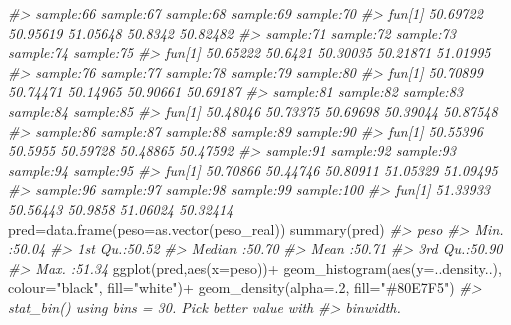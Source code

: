 \documentclass[
]{book}
\newenvironment{Shaded}{\begin{snugshade}}{\end{snugshade}}
\newcommand{\AttributeTok}[1]{\textcolor[rgb]{0.77,0.63,0.00}{#1}}
\newcommand{\CommentTok}[1]{\textcolor[rgb]{0.56,0.35,0.01}{\textit{#1}}}
\newcommand{\DecValTok}[1]{\textcolor[rgb]{0.00,0.00,0.81}{#1}}
\newcommand{\FunctionTok}[1]{\textcolor[rgb]{0.00,0.00,0.00}{#1}}
\newcommand{\NormalTok}[1]{#1}
\newcommand{\OtherTok}[1]{\textcolor[rgb]{0.56,0.35,0.01}{#1}}
\newcommand{\SpecialCharTok}[1]{\textcolor[rgb]{0.00,0.00,0.00}{#1}}
\newcommand{\StringTok}[1]{\textcolor[rgb]{0.31,0.60,0.02}{#1}}
\begin{document}
\begin{Shaded}
\begin{Highlighting}[]
\CommentTok{\#\textgreater{}        sample:66 sample:67 sample:68 sample:69 sample:70}
\CommentTok{\#\textgreater{} fun[1]  50.69722  50.95619  51.05648   50.8342  50.82482}
\CommentTok{\#\textgreater{}        sample:71 sample:72 sample:73 sample:74 sample:75}
\CommentTok{\#\textgreater{} fun[1]  50.65222   50.6421  50.30035  50.21871  51.01995}
\CommentTok{\#\textgreater{}        sample:76 sample:77 sample:78 sample:79 sample:80}
\CommentTok{\#\textgreater{} fun[1]  50.70899  50.74471  50.14965  50.90661  50.69187}
\CommentTok{\#\textgreater{}        sample:81 sample:82 sample:83 sample:84 sample:85}
\CommentTok{\#\textgreater{} fun[1]  50.48046  50.73375  50.69698  50.39044  50.87548}
\CommentTok{\#\textgreater{}        sample:86 sample:87 sample:88 sample:89 sample:90}
\CommentTok{\#\textgreater{} fun[1]  50.55396   50.5955  50.59728  50.48865  50.47592}
\CommentTok{\#\textgreater{}        sample:91 sample:92 sample:93 sample:94 sample:95}
\CommentTok{\#\textgreater{} fun[1]  50.70866  50.44746  50.80911  51.05329  51.09495}
\CommentTok{\#\textgreater{}        sample:96 sample:97 sample:98 sample:99 sample:100}
\CommentTok{\#\textgreater{} fun[1]  51.33933  50.56443   50.9858  51.06024   50.32414}
\NormalTok{pred}\OtherTok{=}\FunctionTok{data.frame}\NormalTok{(}\AttributeTok{peso=}\FunctionTok{as.vector}\NormalTok{(peso\_real))}
\FunctionTok{summary}\NormalTok{(pred)}
\CommentTok{\#\textgreater{}       peso      }
\CommentTok{\#\textgreater{}  Min.   :50.04  }
\CommentTok{\#\textgreater{}  1st Qu.:50.52  }
\CommentTok{\#\textgreater{}  Median :50.70  }
\CommentTok{\#\textgreater{}  Mean   :50.71  }
\CommentTok{\#\textgreater{}  3rd Qu.:50.90  }
\CommentTok{\#\textgreater{}  Max.   :51.34}
\FunctionTok{ggplot}\NormalTok{(pred,}\FunctionTok{aes}\NormalTok{(}\AttributeTok{x=}\NormalTok{peso))}\SpecialCharTok{+}
  \FunctionTok{geom\_histogram}\NormalTok{(}\FunctionTok{aes}\NormalTok{(}\AttributeTok{y=}\NormalTok{..density..), }\AttributeTok{colour=}\StringTok{"black"}\NormalTok{, }\AttributeTok{fill=}\StringTok{"white"}\NormalTok{)}\SpecialCharTok{+}
  \FunctionTok{geom\_density}\NormalTok{(}\AttributeTok{alpha=}\NormalTok{.}\DecValTok{2}\NormalTok{, }\AttributeTok{fill=}\StringTok{"\#80E7F5"}\NormalTok{) }
\CommentTok{\#\textgreater{} \textasciigrave{}stat\_bin()\textasciigrave{} using \textasciigrave{}bins = 30\textasciigrave{}. Pick better value with}
\CommentTok{\#\textgreater{} \textasciigrave{}binwidth\textasciigrave{}.}
\end{Highlighting}
\end{Shaded}
\end{document}
